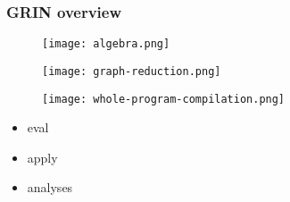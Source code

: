 \documentclass[bigger,aspectratio=169]{beamer}
\begin{document}
\begin{frame}[fragile]
\frametitle{GRIN overview}
\begin{center}

	\begin{minipage}{0.30\textwidth}
		\begin{figure}
			\texttt{[image: algebra.png]}
		\end{figure}
	\end{minipage}
	\hfill
	\begin{minipage}{0.30\textwidth}
		\begin{figure}
			\texttt{[image: graph-reduction.png]}
		\end{figure}
	\end{minipage}
	\hfill
	\begin{minipage}{0.30\textwidth}
		\vspace{1cm}
		\begin{figure}
			\texttt{[image: whole-program-compilation.png]}
		\end{figure}
		\vspace{-0.5cm}
		\begin{itemize}
			\item<1-> eval
			\item<2-> apply
			\item<3-> analyses
		\end{itemize}
	\end{minipage}

\end{center}
\end{frame}
\end{document}
